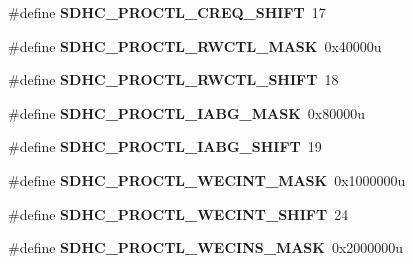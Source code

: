 \begin{DoxyCompactItemize}
\item 
\hypertarget{group___s_d_h_c___register___masks_ga8b783b0ab48e4f66cafa6fc7da38cfbb}{}\#define {\bfseries S\+D\+H\+C\+\_\+\+P\+R\+O\+C\+T\+L\+\_\+\+C\+R\+E\+Q\+\_\+\+S\+H\+I\+F\+T}~17\label{group___s_d_h_c___register___masks_ga8b783b0ab48e4f66cafa6fc7da38cfbb}

\item 
\hypertarget{group___s_d_h_c___register___masks_gadefa120c89ff122b91a0fda6b551930a}{}\#define {\bfseries S\+D\+H\+C\+\_\+\+P\+R\+O\+C\+T\+L\+\_\+\+R\+W\+C\+T\+L\+\_\+\+M\+A\+S\+K}~0x40000u\label{group___s_d_h_c___register___masks_gadefa120c89ff122b91a0fda6b551930a}

\item 
\hypertarget{group___s_d_h_c___register___masks_ga3ba901ecf6267198e180a9299b4c430c}{}\#define {\bfseries S\+D\+H\+C\+\_\+\+P\+R\+O\+C\+T\+L\+\_\+\+R\+W\+C\+T\+L\+\_\+\+S\+H\+I\+F\+T}~18\label{group___s_d_h_c___register___masks_ga3ba901ecf6267198e180a9299b4c430c}

\item 
\hypertarget{group___s_d_h_c___register___masks_ga837bace762b865593415b31c06dbf5c4}{}\#define {\bfseries S\+D\+H\+C\+\_\+\+P\+R\+O\+C\+T\+L\+\_\+\+I\+A\+B\+G\+\_\+\+M\+A\+S\+K}~0x80000u\label{group___s_d_h_c___register___masks_ga837bace762b865593415b31c06dbf5c4}

\item 
\hypertarget{group___s_d_h_c___register___masks_gaf62ddb022a19e9fe0ce3d39eeffadd4a}{}\#define {\bfseries S\+D\+H\+C\+\_\+\+P\+R\+O\+C\+T\+L\+\_\+\+I\+A\+B\+G\+\_\+\+S\+H\+I\+F\+T}~19\label{group___s_d_h_c___register___masks_gaf62ddb022a19e9fe0ce3d39eeffadd4a}

\item 
\hypertarget{group___s_d_h_c___register___masks_ga08649036ee7355491608a89004ab0628}{}\#define {\bfseries S\+D\+H\+C\+\_\+\+P\+R\+O\+C\+T\+L\+\_\+\+W\+E\+C\+I\+N\+T\+\_\+\+M\+A\+S\+K}~0x1000000u\label{group___s_d_h_c___register___masks_ga08649036ee7355491608a89004ab0628}

\item 
\hypertarget{group___s_d_h_c___register___masks_ga575db16a4ed36389472243d329f5ec7c}{}\#define {\bfseries S\+D\+H\+C\+\_\+\+P\+R\+O\+C\+T\+L\+\_\+\+W\+E\+C\+I\+N\+T\+\_\+\+S\+H\+I\+F\+T}~24\label{group___s_d_h_c___register___masks_ga575db16a4ed36389472243d329f5ec7c}

\item 
\hypertarget{group___s_d_h_c___register___masks_gabd871a9e13415808e1743df5b4758d83}{}\#define {\bfseries S\+D\+H\+C\+\_\+\+P\+R\+O\+C\+T\+L\+\_\+\+W\+E\+C\+I\+N\+S\+\_\+\+M\+A\+S\+K}~0x2000000u\label{group___s_d_h_c___register___masks_gabd871a9e13415808e1743df5b4758d83}


\end{DoxyCompactItemize}
